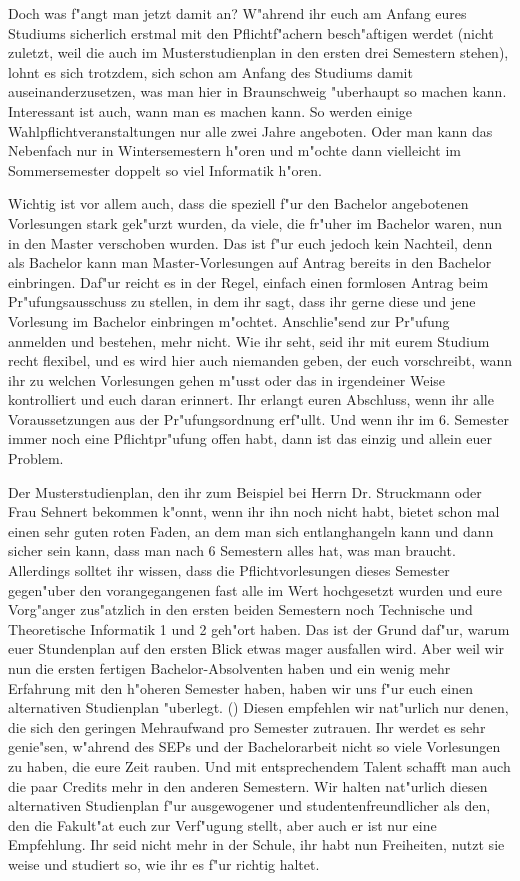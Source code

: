 Doch was f"angt man jetzt damit an? W"ahrend ihr euch am Anfang eures Studiums sicherlich
erstmal mit den Pflichtf"achern besch"aftigen werdet (nicht zuletzt, weil die auch im
Musterstudienplan in den ersten drei Semestern stehen), lohnt es sich trotzdem, sich schon am
Anfang des Studiums damit auseinanderzusetzen, was man hier in Braunschweig "uberhaupt so
machen kann. Interessant ist auch, wann man es machen kann. So werden einige
Wahlpflichtveranstaltungen nur alle zwei Jahre angeboten. Oder man kann das Nebenfach nur in
Wintersemestern h"oren und m"ochte dann vielleicht im Sommersemester doppelt so viel Informatik
h"oren.

Wichtig ist vor allem auch, dass die speziell f"ur den Bachelor angebotenen Vorlesungen stark
gek"urzt wurden, da viele, die fr"uher im Bachelor waren, nun in den Master verschoben wurden. Das
ist f"ur euch jedoch kein Nachteil, denn als Bachelor kann man Master-Vorlesungen auf Antrag
bereits in den Bachelor einbringen. Daf"ur reicht es in der Regel, einfach einen formlosen Antrag
beim Pr"ufungsausschuss zu stellen, in dem ihr sagt, dass ihr gerne diese und jene Vorlesung im
Bachelor einbringen m"ochtet. Anschlie"send zur Pr"ufung anmelden und bestehen, mehr nicht.
Wie ihr seht, seid ihr mit eurem Studium recht flexibel, und es wird hier auch niemanden geben, der
euch vorschreibt, wann ihr zu welchen Vorlesungen gehen m"usst oder das in irgendeiner Weise
kontrolliert und euch daran erinnert. Ihr erlangt euren Abschluss, wenn ihr alle Voraussetzungen aus
der Pr"ufungsordnung erf"ullt. Und wenn ihr im 6. Semester immer noch eine Pflichtpr"ufung offen
habt, dann ist das einzig und allein euer Problem.

Der Musterstudienplan, den ihr zum Beispiel bei Herrn Dr. Struckmann
oder Frau Sehnert bekommen k"onnt, wenn ihr
ihn noch nicht habt, bietet schon mal einen sehr guten roten Faden, an dem man sich entlanghangeln
kann und dann sicher sein kann, dass man nach 6 Semestern alles hat, was man braucht. Allerdings
solltet ihr wissen, dass die Pflichtvorlesungen dieses Semester gegen"uber den vorangegangenen fast
alle im Wert hochgesetzt wurden und eure Vorg"anger zus"atzlich in den ersten beiden Semestern
noch Technische und Theoretische Informatik 1 und 2 geh"ort haben. Das ist der Grund daf"ur,
warum euer Stundenplan auf den ersten Blick etwas mager ausfallen wird. Aber weil wir nun die
ersten fertigen Bachelor-Absolventen haben und ein wenig mehr Erfahrung mit den h"oheren
Semester haben, haben wir uns f"ur euch einen alternativen Studienplan
"uberlegt. (\pageref{studienplan_neu})
Diesen empfehlen wir nat"urlich nur denen, die sich den geringen Mehraufwand pro Semester zutrauen. Ihr werdet es
sehr genie"sen, w"ahrend des SEPs und der Bachelorarbeit nicht so viele Vorlesungen zu haben, die
eure Zeit rauben. Und mit entsprechendem Talent schafft man auch die paar Credits mehr in den
anderen Semestern. Wir halten nat"urlich diesen alternativen Studienplan f"ur ausgewogener und
studentenfreundlicher als den, den die Fakult"at euch zur Verf"ugung stellt, aber auch er ist nur eine
Empfehlung. Ihr seid nicht mehr in der Schule, ihr habt nun Freiheiten, nutzt sie weise und studiert
so, wie ihr es f"ur richtig haltet.


